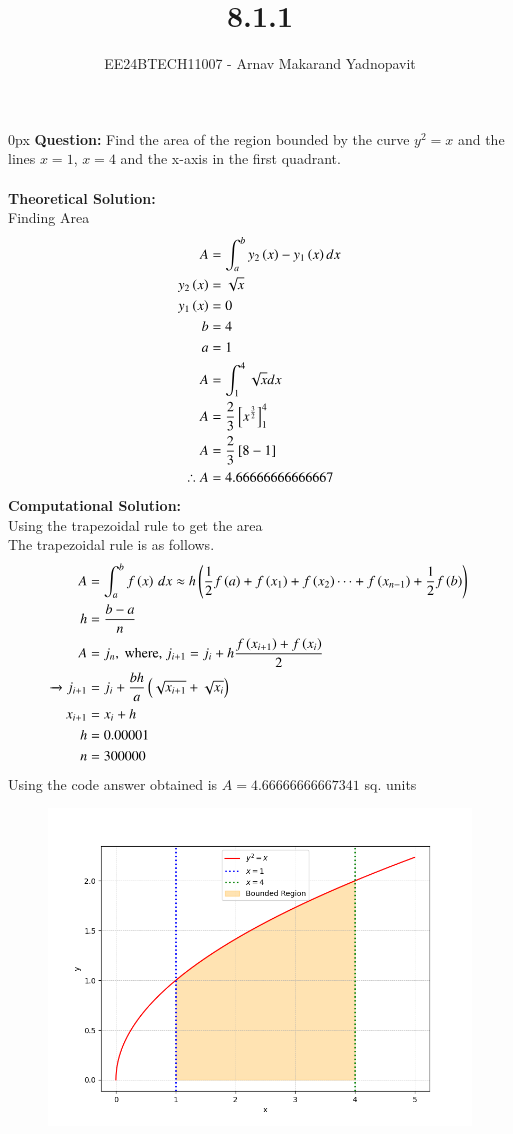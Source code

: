 \documentclass[journal,12pt,onecolumn]{IEEEtran}
\theoremstyle{remark}
\begin{document}
\title{8.1.1}
\author{EE24BTECH11007 - Arnav Makarand Yadnopavit}
\maketitle
\renewcommand{\thefigure}{\theenumi}
\renewcommand{\thetable}{\theenumi}
\parindent 0px \textbf{Question:} Find the area of the region bounded by the curve $y^2=x$ and the lines $x=1$, $x=4$ and the x-axis in the first quadrant.\\
\solution\\
\textbf{Theoretical Solution:}\\
Finding Area
\begin{align}
    A&=\int^{b}_{a}y_2\left(x\right)-y_1\left(x\right)dx\\
    y_2\left(x\right)&=\sqrt{x}\\
    y_1\left(x\right)&=0\\
    b&=4\\
    a&=1\\
    A&=\int^{4}_{1}\sqrt{x}dx\\
    A&=\frac{2}{3}{}\left[x^{\frac{3}{2}}\right]^4_1\\
    A&=\frac{2}{3}{}\left[8-1\right]\\
    \therefore A&=4.66666666666667
\end{align}
\textbf{Computational Solution:}\\
Using the trapezoidal rule to get the area\\
The trapezoidal rule is as follows.
\begin{align}
    A &= \int_a^b f\left(x\right)\, dx \approx h\left(\frac{1}{2}f\left(a\right) + f\left(x_1\right) + f\left(x_2\right) \cdots + f\left(x_{n-1}\right) + \frac{1}{2}f\left(b\right)\right)\\
    h &= \frac{b-a}{n}\\
    A &= j_n, \text{ where, } j_{i + 1} = j_i + h\frac{f\left(x_{i+1}\right) + f\left(x_i\right)}{2}\\ 
        \xrightarrow{} j_{i + 1} &= j_i + \frac{bh}{a}\left(\sqrt{x_{i+1}}+\sqrt{x_{i}}\right)\\
    x_{i+1} &= x_i + h\\
    h&=0.00001\\
    n&=300000
\end{align}
Using the code answer obtained is $A=4.66666666667341$ sq. units
\begin{figure}[h]
    \centering
    \includegraphics[width=\columnwidth]{figs/fig.png}
 \end{figure}
\end{document}
